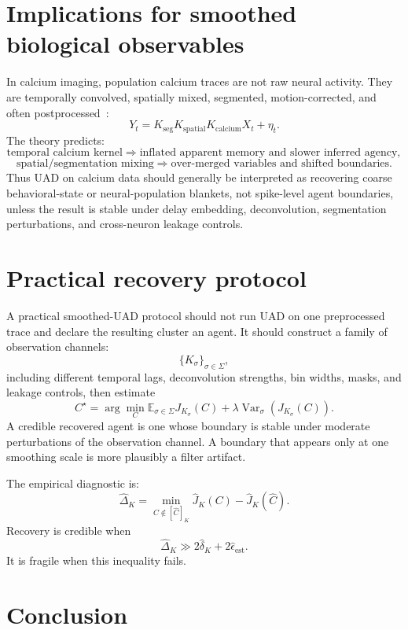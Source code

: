 \documentclass[10pt]{article}
\newcommand{\E}{\mathbb{E}}
\begin{document}
\section{Implications for smoothed biological observables}

In calcium imaging, population calcium traces are not raw neural activity. They are temporally convolved, spatially mixed, segmented, motion-corrected, and often postprocessed~\cite{friston2010free,kaelbling1998pomdp}:
\[
Y_t
=
K_{\mathrm{seg}}
K_{\mathrm{spatial}}
K_{\mathrm{calcium}}
X_t+\eta_t.
\]
The theory predicts:
\[
\text{temporal calcium kernel}
\Rightarrow
\text{inflated apparent memory and slower inferred agency},
\]
\[
\text{spatial/segmentation mixing}
\Rightarrow
\text{over-merged variables and shifted boundaries}.
\]
Thus UAD on calcium data should generally be interpreted as recovering coarse behavioral-state or neural-population blankets, not spike-level agent boundaries, unless the result is stable under delay embedding, deconvolution, segmentation perturbations, and cross-neuron leakage controls.

\section{Practical recovery protocol}

A practical smoothed-UAD protocol should not run UAD on one preprocessed trace and declare the resulting cluster an agent. It should construct a family of observation channels:
\[
\{K_\sigma\}_{\sigma\in\Sigma},
\]
including different temporal lags, deconvolution strengths, bin widths, masks, and leakage controls, then estimate
\[
C^\star
=
\arg\min_C
\E_{\sigma\in\Sigma}J_{K_\sigma}(C)
+
\lambda\operatorname{Var}_{\sigma}(J_{K_\sigma}(C)).
\]
A credible recovered agent is one whose boundary is stable under moderate perturbations of the observation channel. A boundary that appears only at one smoothing scale is more plausibly a filter artifact.

The empirical diagnostic is:
\[
\widehat{\Delta}_K
=
\min_{C\notin[\hat C]_K}
\hat J_K(C)-\hat J_K(\hat C).
\]
Recovery is credible when
\[
\widehat{\Delta}_K
\gg
2\widehat{\delta}_K
+
2\widehat{\epsilon}_{\mathrm{est}}.
\]
It is fragile when this inequality fails.

\section{Conclusion}
\end{document}
